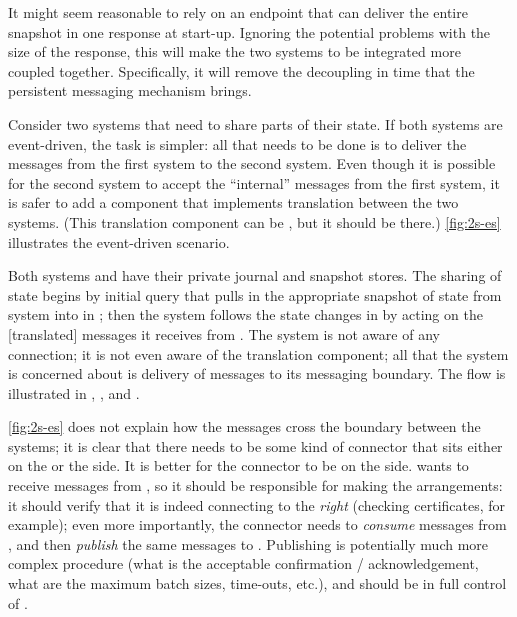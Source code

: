 It might seem reasonable to rely on an endpoint that can deliver the entire snapshot in one response at start-up. Ignoring the potential problems with the size of the response, this will make the two systems to be integrated more coupled together. Specifically, it will remove the decoupling in time that the persistent messaging mechanism brings. 

Consider two systems that need to share parts of their state. If both systems are event-driven, the task is simpler: all that needs to be done is to deliver the messages from the first system to the second system. Even though it is possible for the second system to accept the ``internal'' messages from the first system, it is safer to add a component that implements translation between the two systems. (This translation component can be , but it should be there.) \autoref{fig:2s-es} illustrates the event-driven scenario.


Both systems  and  have their private journal and snapshot stores. The sharing of state begins by initial query that pulls in the appropriate snapshot of state from system  into  in ; then the system  follows the state changes in  by acting on the [translated] messages it receives from . The system  is not aware of any connection; it is not even aware of the translation component; all that the system  is concerned about is delivery of messages to its messaging boundary. The flow is illustrated in , , and .

\autoref{fig:2s-es} does not explain how the messages cross the boundary between the systems; it is clear that there needs to be some kind of connector that sits either on the  or the  side. It is better for the connector to be on the  side.  wants to receive messages from , so it should be responsible for making the arrangements: it should verify that it is indeed connecting to the \emph{right}  (checking certificates, for example); even more importantly, the connector needs to \emph{consume} messages from , and then \emph{publish} the same messages to . Publishing is potentially much more complex procedure (what is the acceptable confirmation / acknowledgement, what are the maximum batch sizes, time-outs, etc.), and should be in full control of \cite{mirrormaker}.  

